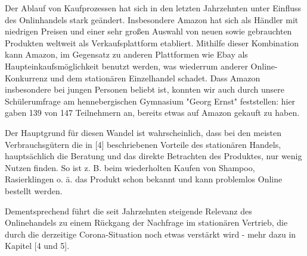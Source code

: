 Der Ablauf von Kaufprozessen hat sich in den letzten Jahrzehnten unter Einfluss des Onlinhandels stark geändert. Insbesondere Amazon hat sich als Händler mit niedrigen Preisen und einer sehr großen Auswahl von neuen sowie gebrauchten Produkten weltweit als Verkaufsplattform etabliert. Mithilfe dieser Kombination kann Amazon, im Gegensatz zu anderen Plattformen wie Ebay als Haupteinkaufsmöglichkeit benutzt werden, was wiederrum anderer Online-Konkurrenz und dem stationären Einzelhandel schadet. Dass Amazon insbesondere bei jungen Personen beliebt ist, konnten wir auch durch unsere Schülerumfrage am hennebergischen Gymnasium "Georg Ernst" feststellen: hier gaben 139 von 147 Teilnehmern an, bereits etwas auf Amazon gekauft zu haben.


Der Hauptgrund für diesen Wandel ist wahrscheinlich, dass bei den meisten Verbrauchsgütern die in [4] beschriebenen Vorteile des stationären Handels, hauptsächlich die Beratung und das direkte Betrachten des Produktes, nur wenig Nutzen finden\cite[S. 2]{Maier}. So ist z. B. beim wiederholten Kaufen von Shampoo, Rasierklingen o. ä. das Produkt schon bekannt und kann problemlos Online bestellt werden. 
\iffalse
    über zeit unkomplizierter geworden
    
    verbilligung des onlinehandels > prime-verlust
    amazon = vorreiter, aliexpress
    
    aliexpress: direkt von hersteller kaufen (https://www.emerald.com/insight/content/doi/10.1108/S1745-886220180000013014/full/pdf?title=italicamazon-and-alibabaitalic-internet-governance-business-models-and-internationalization-strategies 345)
\fi
Dementsprechend führt die seit Jahrzehnten steigende Relevanz des Onlinehandels zu einem Rückgang der Nachfrage im stationären Vertrieb\cite{Shankar}, die durch die derzeitige Corona-Situation noch etwas verstärkt wird - mehr dazu in Kapitel [4 und 5].

\iffalse
 Vorreiter in sachen niedrige Preise > ist sehr wichtig, weil
   viel einfacher vergelichbar, qualität des Produkts nicht einfach einsehbar: sie muss nicht außergewöhnlich, nur akzeptabel sein - jedoch auch nicht schlecht, da 14-tage-rückgabe ohne angabe eines grundes

 
 S 49 https://edoc.sub.uni-hamburg.de/hcu/volltexte/2017/370/pdf/Ebert_Kirsten.pdf
 danach: modell für veränderung
\fi
